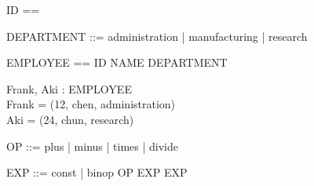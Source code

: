 \documentclass{llncs}
\begin{document}
\begin{zed}
[NAME]
\end{zed}
\begin{zed}
ID == \nat
\end{zed}
\begin{zed}
DEPARTMENT ::= administration | manufacturing | research
\end{zed}
\begin{zed}
EMPLOYEE == ID \cross NAME \cross DEPARTMENT
\end{zed}
\begin{axdef}
Frank, Aki : EMPLOYEE \\
\where Frank = (12, chen, administration) \\
Aki = (24, chun, research)
\end{axdef}

\begin{zed}
OP ::= plus | minus | times | divide
\end{zed}
\begin{zed}
EXP ::= const \ldata \nat \rdata | binop \ldata OP \cross EXP
\cross EXP \rdata
\end{zed}
\end{document}
